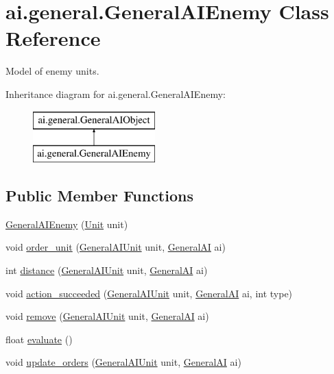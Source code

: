 \hypertarget{classai_1_1general_1_1_general_a_i_enemy}{
\section{ai.general.GeneralAIEnemy Class Reference}
\label{classai_1_1general_1_1_general_a_i_enemy}
}


Model of enemy units.  


Inheritance diagram for ai.general.GeneralAIEnemy:\begin{figure}[H]
\begin{center}
\leavevmode
\includegraphics[height=2.000000cm]{classai_1_1general_1_1_general_a_i_enemy}
\end{center}
\end{figure}
\subsection*{Public Member Functions}
\begin{DoxyCompactItemize}
\item 
\hyperlink{classai_1_1general_1_1_general_a_i_enemy_a5779af37ecfc3fc6bb964ceca2399916}{GeneralAIEnemy} (\hyperlink{classrts_1_1units_1_1_unit}{Unit} unit)
\item 
void \hyperlink{classai_1_1general_1_1_general_a_i_enemy_af06251179b134f771a5b66eda70f8e1c}{order\_\-unit} (\hyperlink{classai_1_1general_1_1_general_a_i_unit}{GeneralAIUnit} unit, \hyperlink{classai_1_1general_1_1_general_a_i}{GeneralAI} ai)
\item 
int \hyperlink{classai_1_1general_1_1_general_a_i_enemy_ac1c3cfb3e42fc68123d3be827013d7f5}{distance} (\hyperlink{classai_1_1general_1_1_general_a_i_unit}{GeneralAIUnit} unit, \hyperlink{classai_1_1general_1_1_general_a_i}{GeneralAI} ai)
\item 
void \hyperlink{classai_1_1general_1_1_general_a_i_enemy_ae978f80f0eda19ac4481536719287f8d}{action\_\-succeeded} (\hyperlink{classai_1_1general_1_1_general_a_i_unit}{GeneralAIUnit} unit, \hyperlink{classai_1_1general_1_1_general_a_i}{GeneralAI} ai, int type)
\item 
void \hyperlink{classai_1_1general_1_1_general_a_i_enemy_afeb5356cd8cf673ec19531a974c70dee}{remove} (\hyperlink{classai_1_1general_1_1_general_a_i_unit}{GeneralAIUnit} unit, \hyperlink{classai_1_1general_1_1_general_a_i}{GeneralAI} ai)
\item 
float \hyperlink{classai_1_1general_1_1_general_a_i_enemy_acca3e26cc71ed08e439d229ab1e6327f}{evaluate} ()
\item 
void \hyperlink{classai_1_1general_1_1_general_a_i_enemy_a4503bbce0cbbed64df4b153773f90dab}{update\_\-orders} (\hyperlink{classai_1_1general_1_1_general_a_i_unit}{GeneralAIUnit} unit, \hyperlink{classai_1_1general_1_1_general_a_i}{GeneralAI} ai)
\end{DoxyCompactItemize}
